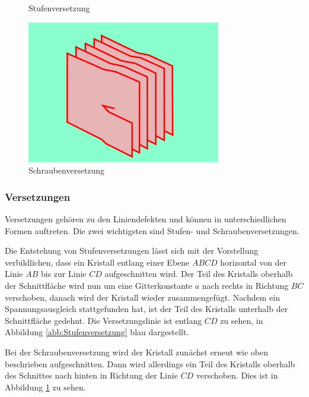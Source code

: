 \documentclass[12pt,a4paper]{scrartcl}
\numberwithin{equation}{section} %
\begin{document}
\begin{figure}[ht]
\begin{minipage}[t]{0.3\textwidth}
		\caption{Stufenversetzung \cite{WikipediaStufe}}
		\label{abb:Stufenversetzung}
	\end{minipage}
	\begin{minipage}[t]{0.3\textwidth}
		\centering
		\includegraphics[width=\textwidth]{../media/B2.5/320px-Dislocation_screw_e.svg.png}
		\caption{Schraubenversetzung \cite{WikipediaSchraube}}
		\label{abb:Schraubenversetzung}
	\end{minipage}
\end{figure}

\hypertarget{versetzungen}{
\subsubsection{Versetzungen}\label{versetzungen}}
Versetzungen gehören zu den Liniendefekten und können in unterschiedlichen Formen auftreten. Die zwei wichtigsten sind Stufen- und Schraubenversetzungen.

Die Entstehung von Stufenversetzungen lässt sich mit der Vorstellung verbildlichen, dass  ein Kristall entlang einer Ebene $ABCD$ horizontal von der Linie $AB$ bis zur Linie $CD$ aufgeschnitten wird. Der Teil des Kristalls oberhalb der Schnittfläche wird nun um eine Gitterkonstante $a$ nach rechts in Richtung $BC$ verschoben, danach wird der Kristall wieder zusammengefügt. Nachdem ein Spannungsausgleich stattgefunden hat, ist der Teil des Kristalls unterhalb der Schnittfläche gedehnt. Die Versetzungslinie ist entlang $CD$ zu sehen, in Abbildung \ref{abb:Stufenversetzung} blau dargestellt.

Bei der Schraubenversetzung wird der Kristall zunächst erneut wie oben beschrieben aufgeschnitten. Dann wird allerdings ein Teil des Kristalls oberhalb des Schnittes nach hinten in Richtung der Linie $CD$ verschoben. Dies ist in Abbildung \ref{abb:Schraubenversetzung} zu sehen.
\end{document}
